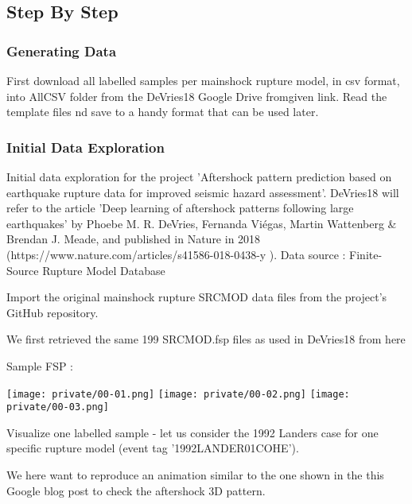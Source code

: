 \documentclass[journal,transmag]{IEEEtran}
\begin{document}
\subsection*{Step By Step}

\vspace{0.5em}
\subsubsection{Generating Data}
\vspace{0.5em}

First download all labelled samples per mainshock rupture model, in csv format, into AllCSV folder from the DeVries18 Google Drive fromgiven link.
Read the template files nd save to a handy format that can be used later.

\vspace{0.5em}
\subsubsection{Initial Data Exploration}
\vspace{0.5em}

Initial data exploration for the project 'Aftershock pattern prediction based on earthquake rupture data for improved seismic hazard assessment'. DeVries18 will refer to the article 'Deep learning of aftershock patterns following large earthquakes' by Phoebe M. R. DeVries, Fernanda Viégas, Martin Wattenberg \& Brendan J. Meade, and published in Nature in 2018 (https://www.nature.com/articles/s41586-018-0438-y ).
Data source : Finite-Source Rupture Model Database

Import the original mainshock rupture SRCMOD data files from the project's GitHub repository.

We first retrieved the same 199 SRCMOD.fsp files as used in DeVries18 from here

Sample FSP :

\begin{center}
  \texttt{[image: private/00-01.png]}
  \texttt{[image: private/00-02.png]}
  \texttt{[image: private/00-03.png]}
\end{center}

Visualize one labelled sample - let us consider the 1992 Landers case for one specific rupture model (event tag '1992LANDER01COHE').

We here want to reproduce an animation similar to the one shown in the this Google blog post to check the aftershock 3D pattern.
\end{document}
